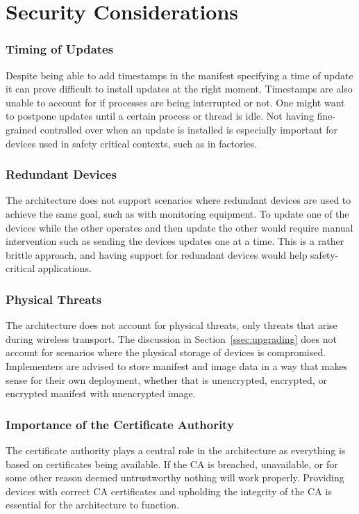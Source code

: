 \documentclass[0-thesis.tex]{subfiles}
\begin{document}
\section{Security Considerations}
\label{sec:security-considerations}

\subsubsection{Timing of Updates}
Despite being able to add timestamps in the manifest specifying a time of update it can
prove difficult to install updates at the right moment. Timestamps are also unable to
account for if processes are being interrupted or not. One might want to postpone updates
until a certain process or thread is idle. Not having fine-grained controlled over when an
update is installed is especially important for devices used in safety critical contexts,
such as in factories.

\subsubsection{Redundant Devices}
The architecture does not support scenarios where redundant devices are used to achieve
the same goal, such as with monitoring equipment. To update one of the devices while the other
operates and then update the other would require manual intervention such as sending the
devices updates one at a time. This is a rather brittle approach, and having support for
redundant devices would help safety-critical applications.

\subsubsection{Physical Threats}
The architecture does not account for physical threats, only threats that arise during
wireless transport. The discussion in Section~\ref{ssec:upgrading} does not account for
scenarios where the physical storage of devices is compromised. Implementers are advised
to store manifest and image data in a way that makes sense for their own deployment,
whether that is unencrypted, encrypted, or encrypted manifest with unencrypted image.

\subsubsection{Importance of the Certificate Authority}
The certificate authority plays a central role in the architecture as everything is based
on certificates being available. If the CA is breached, unavailable, or for some other
reason deemed untrustworthy nothing will work properly. Providing devices with correct CA
certificates and upholding the integrity of the CA is essential for the architecture to
function.
\end{document}
